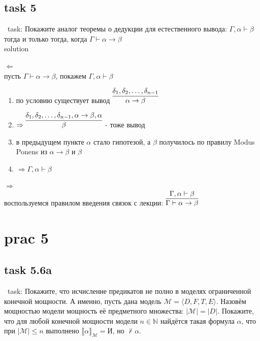 \documentclass[12pt]{article}
\begin{document}
\subsection*{task 5}

\quad\ task: Покажите аналог теоремы о дедукции для естественного вывода: $\Gamma,\alpha\vdash\beta$ тогда и только тогда, когда
$\Gamma\vdash\alpha\rightarrow\beta$\\

solution

$\Leftarrow$\\
пусть $\Gamma\vdash\alpha\rightarrow\beta$, покажем $\Gamma,\alpha\vdash\beta$
\begin{enumerate}
    \item по условию существует вывод $\infer{\alpha\rightarrow\beta}{\delta_1, \delta_2, \dots, \delta_{n-1}}$
    
    \item $\Rightarrow \infer{\beta}{\delta_1, \delta_2, \dots, \delta_{n-1}, \alpha\rightarrow\beta, \alpha}$ - тоже вывод

    \item в предыдущем пункте $\alpha$ стало гипотезой, а $\beta$ получилось по правилу Modus Ponens из $\alpha\rightarrow\beta$ и $\beta$

    \item $\Rightarrow \Gamma,\alpha\vdash\beta$
\end{enumerate}

$\Rightarrow$\\

воспользуемся правилом введения связок с лекции: $\infer{\Gamma\vdash\alpha\rightarrow\beta}{\Gamma,\alpha\vdash\beta}$

\section*{prac 5}

\subsection*{task 5.6a}

\quad\ task: Покажите, что исчисление предикатов не полно в моделях ограниченной конечной мощности. 
А именно, пусть дана модель $\mathcal{M} = \langle D, F, T, E \rangle$. 
Назовём мощностью модели мощность её предметного множества: $|\mathcal{M}| = |D|$.
Покажите, что для любой конечной мощности модели $n\in\mathbb{N}$ найдётся такая формула $\alpha$, что 
при $|\mathcal{M}|\le n$ выполнено $\llbracket\alpha\rrbracket_\mathcal{M} = \text{И}$, но $\not\vdash\alpha$.\\
\end{document}
